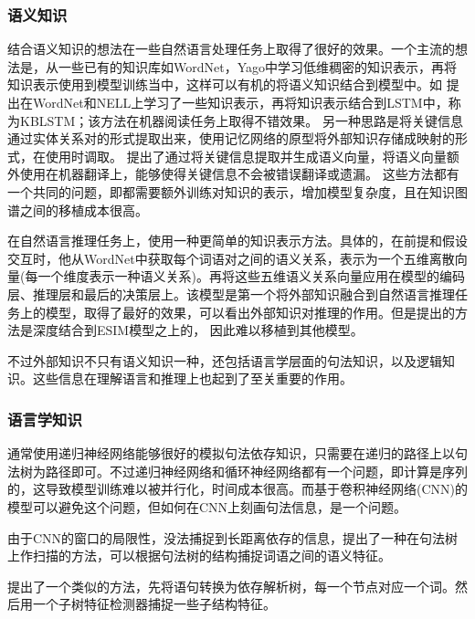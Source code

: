 \documentclass[UTF8,11pt,a4paper,nofonts]{ctexart}
\begin{document}
\subsubsection{语义知识}

结合语义知识的想法在一些自然语言处理任务上取得了很好的效果。一个主流的想法是，从一些已有的知识库如WordNet，Yago中学习低维稠密的知识表示，再将知识表示使用到模型训练当中，这样可以有机的将语义知识结合到模型中。如
\cite{Yang2017LeveragingKB}提出在WordNet和NELL上学习了一些知识表示，再将知识表示结合到LSTM中，称为KBLSTM；该方法在机器阅读任务上取得不错效果。
另一种思路是将关键信息通过实体关系对的形式提取出来，使用记忆网络的原型将外部知识存储成映射的形式，在使用时调取。
\cite{Shi2016KnowledgeBasedSE}提出了通过将关键信息提取并生成语义向量，将语义向量额外使用在机器翻译上，能够使得关键信息不会被错误翻译或遗漏。
这些方法都有一个共同的问题，即都需要额外训练对知识的表示，增加模型复杂度，且在知识图谱之间的移植成本很高。

在自然语言推理任务上，\cite{Chen2017NaturalLI}使用一种更简单的知识表示方法。具体的，在前提和假设交互时，他从WordNet中获取每个词语对之间的语义关系，表示为一个五维离散向量(每一个维度表示一种语义关系)。再将这些五维语义关系向量应用在模型的编码层、推理层和最后的决策层上。该模型是第一个将外部知识融合到自然语言推理任务上的模型，取得了最好的效果，可以看出外部知识对推理的作用。但是\cite{Chen2017NaturalLI}提出的方法是深度结合到ESIM模型之上的，
因此难以移植到其他模型。

不过外部知识不只有语义知识一种，还包括语言学层面的句法知识，以及逻辑知识。这些信息在理解语言和推理上也起到了至关重要的作用。

\subsubsection{语言学知识}

通常使用递归神经网络能够很好的模拟句法依存知识，只需要在递归的路径上以句法树为路径即可\cite{Socher2012SemanticCT}。不过递归神经网络和循环神经网络都有一个问题，即计算是序列的，这导致模型训练难以被并行化，时间成本很高。而基于卷积神经网络(CNN)的模型可以避免这个问题，但如何在CNN上刻画句法信息，是一个问题。

由于CNN的窗口的局限性，没法捕捉到长距离依存的信息，\cite{Ma2015DependencybasedCN}提出了一种在句法树上作扫描的方法，可以根据句法树的结构捕捉词语之间的语义特征。

\cite{Mou2016NaturalLI}提出了一个类似的方法，先将语句转换为依存解析树，每一个节点对应一个词。然后用一个子树特征检测器捕捉一些子结构特征。
\end{document}
